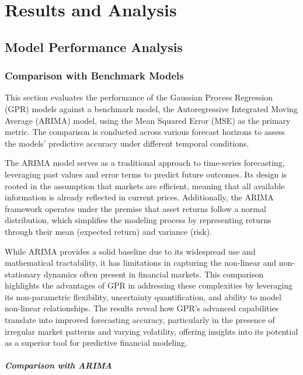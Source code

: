 
\chapter{Results and Analysis}\label{chapter:results and analysis}
\section{Model Performance Analysis}

\subsection{Comparison with Benchmark Models}

This section evaluates the performance of the Gaussian Process Regression (GPR) models against a benchmark model, the Autoregressive Integrated Moving Average (ARIMA) model, using the Mean Squared Error (MSE) as the primary metric. The comparison is conducted across various forecast horizons to assess the models' predictive accuracy under different temporal conditions.

The \ac{ARIMA} model serves as a traditional approach to time-series forecasting, leveraging past values and error terms to predict future outcomes. Its design is rooted in the assumption that markets are efficient, meaning that all available information is already reflected in current prices. Additionally, the ARIMA framework operates under the premise that asset returns follow a normal distribution, which simplifies the modeling process by representing returns through their mean (expected return) and variance (risk).

While \ac{ARIMA} provides a solid baseline due to its widespread use and mathematical tractability, it has limitations in capturing the non-linear and non-stationary dynamics often present in financial markets. 
This comparison highlights the advantages of GPR in addressing these complexities by leveraging its non-parametric flexibility, uncertainty quantification, and ability to model non-linear relationships. The results reveal how GPR's advanced capabilities translate into improved forecasting accuracy, particularly in the presence of irregular market patterns and varying volatility, offering insights into its potential as a superior tool for predictive financial modeling.

\paragraph{Comparison with ARIMA}

